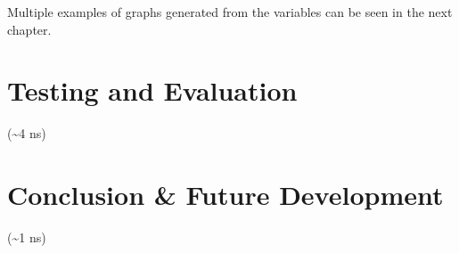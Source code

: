             Multiple examples of graphs generated from the variables can be seen in the next chapter.


    \section{}


\chapter{Testing and Evaluation}
    (\textasciitilde4 ns)

\chapter{Conclusion \& Future Development}
    (\textasciitilde1 ns)
